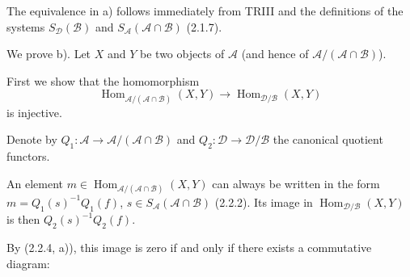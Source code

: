 The equivalence in a) follows immediately from TRIII and the definitions
of the systems $S_{\mathcal D}(\mathcal B)$ and
$S_{\mathcal A}(\mathcal A\cap\mathcal B)$ (2.1.7).

We prove b). Let $X$ and $Y$ be two objects of $\mathcal A$ (and hence of
$\mathcal A/(\mathcal A\cap\mathcal B)$).

First we show that the homomorphism
\[
  \operatorname{Hom}_{\mathcal A/(\mathcal A\cap\mathcal B)}(X,Y)
  \longrightarrow
  \operatorname{Hom}_{\mathcal D/\mathcal B}(X,Y)
\]
is injective.

Denote by
$Q_1\colon\mathcal A\longrightarrow
\mathcal A/(\mathcal A\cap\mathcal B)$ and
$Q_2\colon\mathcal D\longrightarrow\mathcal D/\mathcal B$ the canonical
quotient functors.

An element
$m\in\operatorname{Hom}_{\mathcal A/(\mathcal A\cap\mathcal B)}(X,Y)$ can
always be written in the form $m=Q_1(s)^{-1}Q_1(f)$,
$s\in S_{\mathcal A}(\mathcal A\cap\mathcal B)$ (2.2.2). Its image in
$\operatorname{Hom}_{\mathcal D/\mathcal B}(X,Y)$ is then
$Q_2(s)^{-1}Q_2(f)$.

By (2.2.4, a)), this image is zero if and only if there exists a
commutative diagram:

\begin{center}
\end{center}
\endgroup
